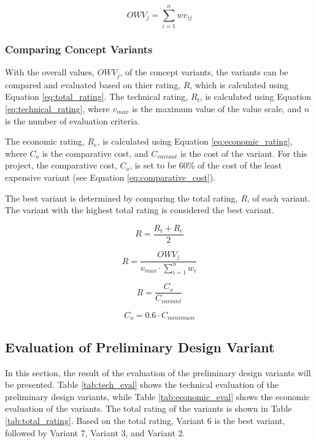 \begin{equation}
    OWV_{j}=\sum_{i=1}^{n}wv_{ij}
    \label{eq:weighted_sum}
\end{equation}

\subsubsection{Comparing Concept Variants}
With the overall values, $OWV_{j}$, of the concept variants, the variants can be compared and evaluated based on thier rating, $R$, which is calculated using Equation \ref{eq:total_rating}. The technical rating, $R_{t}$, is calculated using Equation \ref{eq:technical_rating}, where $v_{max}$ is the maximum value of the value scale, and $n$ is the number of evaluation criteria.

The economic rating, $R_{e}$, is calculated using Equation \ref{eq:economic_rating}, where $C_{o}$ is the comparative cost, and $C_{variant}$ is the cost of the variant. For this project, the comparative cost, $C_{o}$, is set to be 60\% of the cost of the least expensive variant (see Equation \ref{eq:comparative_cost}).

The best variant is determined by comparing the total rating, $R$, of each variant. The variant with the highest total rating is considered the best variant.

\begin{equation}
    R=\frac{R_{t}+R_{e}}{2}
    \label{eq:total_rating}
\end{equation}

\begin{equation}
    R=\frac{OWV_{j}}{v_{max}\cdot\sum_{i=1}^{n}w_{i}}
    \label{eq:technical_rating}
\end{equation}

\begin{equation}
    R=\frac{C_{o}}{C_{variant}}
    \label{eq:economic_rating}
\end{equation}

\begin{equation}
    C_{o}=0.6\cdot C_{minimum}
    \label{eq:comparative_cost}
\end{equation}

\subsection{Evaluation of Preliminary Design Variant}
In this section, the result of the evaluation of the preliminary design variants will be presented. Table \ref{tab:tech_eval} shows the technical evaluation of the preliminary design variants, while Table \ref{tab:economic_eval} shows the economic evaluation of the variants. The total rating of the variants is shown in Table \ref{tab:total_rating}. Based on the total rating, Variant 6 is the best variant, followed by Variant 7, Variant 3, and Variant 2.

